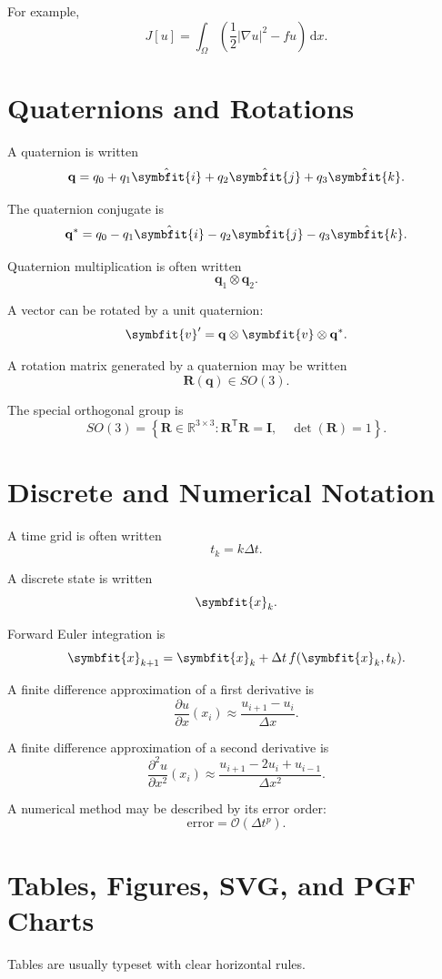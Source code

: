 \documentclass[11pt,twocolumn]{article}
\newcommand{\R}{\mathbb{R}}
\newcommand{\vct}[1]{\symbfit{#1}}   %
\newcommand{\mat}[1]{\symbf{#1}}     %
\newcommand{\ihat}{\hat{\vct{i}}}
\newcommand{\jhat}{\hat{\vct{j}}}
\newcommand{\khat}{\hat{\vct{k}}}
\newcommand{\T}{^{\mathsf{T}}}
\newcommand{\determinant}{\operatorname{det}}
\newcommand{\abs}[1]{\left\lvert #1 \right\rvert}
\newcommand{\dd}{\,\mathrm{d}}
\newcommand{\pdv}[2]{\frac{\partial #1}{\partial #2}}
\newcommand{\pdvtwo}[2]{\frac{\partial^2 #1}{\partial #2^2}}
\newcommand{\grad}{\nabla}
\newcommand{\quat}[1]{\mathbf{#1}}
\newcommand{\qconj}[1]{#1^{*}}
\newcommand{\qmul}{\otimes}
\newcommand{\bigO}{\mathcal{O}}
\begin{document}
For example,
\[
J[u]
=
\int_{\Omega}
\left(
\frac{1}{2}\abs{\grad u}^2
-
fu
\right)\dd x.
\]

\section{Quaternions and Rotations}

A quaternion is written
\[
\quat{q}
=
q_0
+
q_1\ihat
+
q_2\jhat
+
q_3\khat.
\]

The quaternion conjugate is
\[
\qconj{\quat{q}}
=
q_0
-
q_1\ihat
-
q_2\jhat
-
q_3\khat.
\]

Quaternion multiplication is often written
\[
\quat{q}_1 \qmul \quat{q}_2.
\]

A vector can be rotated by a unit quaternion:
\[
\vct{v}'
=
\quat{q}
\qmul
\vct{v}
\qmul
\qconj{\quat{q}}.
\]

A rotation matrix generated by a quaternion may be written
\[
\mat{R}(\quat{q}) \in SO(3).
\]

The special orthogonal group is
\[
SO(3)
=
\left\{
\mat{R}\in\R^{3\times3}
:
\mat{R}\T\mat{R}=\mat{I},
\quad
\determinant(\mat{R})=1
\right\}.
\]

\section{Discrete and Numerical Notation}

A time grid is often written
\[
t_k = k\Delta t.
\]

A discrete state is written
\[
\vct{x}_k.
\]

Forward Euler integration is
\[
\vct{x}_{k+1}
=
\vct{x}_k
+
\Delta t\,f(\vct{x}_k,t_k).
\]

A finite difference approximation of a first derivative is
\[
\pdv{u}{x}(x_i)
\approx
\frac{u_{i+1}-u_i}{\Delta x}.
\]

A finite difference approximation of a second derivative is
\[
\pdvtwo{u}{x}(x_i)
\approx
\frac{u_{i+1}-2u_i+u_{i-1}}{\Delta x^2}.
\]

A numerical method may be described by its error order:
\[
\text{error}
=
\bigO(\Delta t^p).
\]

\section{Tables, Figures, SVG, and PGF Charts}

Tables are usually typeset with clear horizontal rules.
\end{document}
